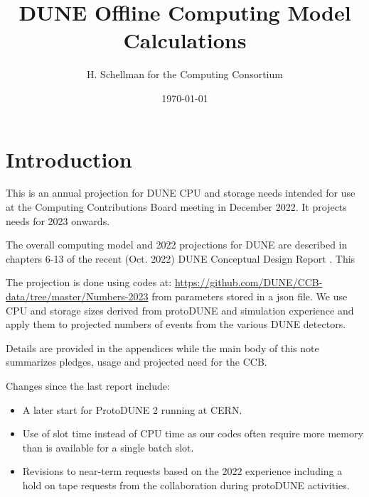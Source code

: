 \documentclass[12pt]{article}
\title{DUNE Offline Computing Model Calculations}
\author{H. Schellman for the Computing Consortium}
\date{\today}
\begin{document}
\makeatletter
{}
\makeatother
\newcommand{\csvautotabularright}[2][]{\csvloop{autotabularright={#2},#1}}

\maketitle
\section{Introduction}

This is an annual projection for DUNE CPU and storage needs intended for use at the Computing Contributions Board meeting in December 2022. It projects needs for 2023 onwards. 

The overall computing model  and 2022 projections for DUNE are described in chapters 6-13 of the recent (Oct. 2022) DUNE Conceptual Design Report \cite{DUNE:2022fcw}.   This 

The projection is done using codes at: \href{https://github.com/DUNE/CCB-data/tree/master/Numbers-2023}{https://github.com/DUNE/CCB-data/tree/master/Numbers-2023} from parameters stored in a json file. We use CPU and storage sizes derived from protoDUNE and simulation experience and apply them to projected numbers of events from the various DUNE detectors. 

Details are provided in the appendices while the main body of this note summarizes pledges, usage and projected need for the CCB.

Changes since the last report include:

\begin{itemize}
\item A later start for ProtoDUNE 2 running at CERN.
\item Use of slot time instead of CPU time as our codes often require more memory than is available for a single batch slot. 
\item Revisions to near-term requests based on the 2022 experience including a hold on tape requests from the collaboration during protoDUNE activities. 
\end{itemize}
\end{document}
